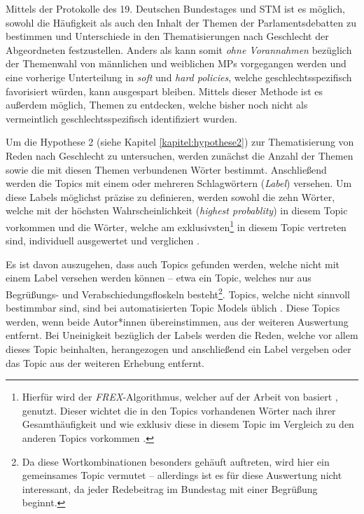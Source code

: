 \documentclass[12pt, 
    twoside=false, 
    bibliography=totoc, 
    numbers=endperiod, 
    headings=normal, 
    toc=chapterentrydotfill
    ]{scrbook}
\begin{document}
Mittels der Protokolle des 19. Deutschen Bundestages und STM ist es möglich, sowohl die Häufigkeit als auch den Inhalt der Themen der Parlamentsdebatten zu bestimmen und Unterschiede in den Thematisierungen nach Geschlecht der Abgeordneten festzustellen. Anders als \textcite{back_2014} kann somit \emph{ohne Vorannahmen} bezüglich der Themenwahl von männlichen und weiblichen MPs vorgegangen werden und eine vorherige Unterteilung in \emph{soft} und \emph{hard policies}, welche geschlechtsspezifisch favorisiert würden, kann ausgespart bleiben. Mittels dieser Methode ist es außerdem möglich, Themen zu entdecken, welche bisher noch nicht als vermeintlich geschlechtsspezifisch identifiziert wurden.

Um die Hypothese 2 (siehe Kapitel \ref{kapitel:hypothese2}) zur Thematisierung von Reden nach Geschlecht zu untersuchen, werden zunächst die Anzahl der Themen sowie die mit diesen Themen verbundenen Wörter bestimmt. Anschließend werden die Topics mit einem oder mehreren Schlagwörtern (\emph{Label}) versehen. Um diese Labels möglichst präzise zu definieren, werden sowohl die zehn Wörter, welche mit der höchsten Wahrscheinlichkeit (\emph{highest probablity}) in diesem Topic vorkommen und die Wörter, welche am exklusivsten\footnote{Hierfür wird der \emph{FREX}-Algorithmus, welcher auf der Arbeit von \textcite{airoldi_2016} basiert \parencite[12]{roberts_2018}, genutzt. Dieser wichtet die in den Topics vorhandenen Wörter nach ihrer Gesamthäufigkeit und wie exklusiv diese in diesem Topic im Vergleich zu den anderen Topics vorkommen \parencite[13f.]{roberts_2018}.} in diesem Topic vertreten sind, individuell ausgewertet und verglichen \parencite[13f.]{roberts_2018}. 

Es ist davon auszugehen, dass auch Topics gefunden werden, welche nicht mit einem Label versehen werden können -- etwa ein Topic, welches nur aus Begrüßungs- und Verabschiedungsfloskeln besteht\footnote{Da diese Wortkombinationen besonders gehäuft auftreten, wird hier ein gemeinsames Topic vermutet -- allerdings ist es für diese Auswertung nicht interessant, da jeder Redebeitrag im Bundestag mit einer Begrüßung beginnt.}. Topics, welche nicht sinnvoll bestimmbar sind, sind bei automatisierten Topic Models üblich \parencites[262]{mimno_2011}[11]{grajzl_2018}. Diese Topics werden, wenn beide Autor*innen übereinstimmen, aus der weiteren Auswertung entfernt. Bei Uneinigkeit bezüglich der Labels werden die Reden, welche vor allem dieses Topic beinhalten, herangezogen und anschließend ein Label vergeben oder das Topic aus der weiteren Erhebung entfernt.
\end{document}
